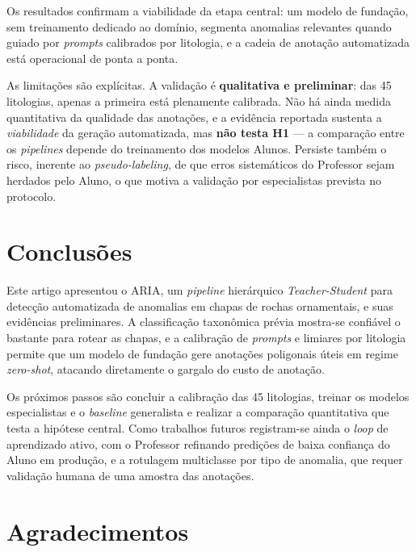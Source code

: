 \documentclass[10pt,conference]{IEEEtran}
\begin{document}
Os resultados confirmam a viabilidade da etapa central: um modelo de fundação, sem treinamento dedicado ao domínio, segmenta anomalias relevantes quando guiado por \textit{prompts} calibrados por litologia, e a cadeia de anotação automatizada está operacional de ponta a ponta.

As limitações são explícitas. A validação é \textbf{qualitativa e preliminar}: das 45 litologias, apenas a primeira está plenamente calibrada. Não há ainda medida quantitativa da qualidade das anotações, e a evidência reportada sustenta a \textit{viabilidade} da geração automatizada, mas \textbf{não testa H1} --- a comparação entre os \textit{pipelines} depende do treinamento dos modelos Alunos. Persiste também o risco, inerente ao \textit{pseudo-labeling}, de que erros sistemáticos do Professor sejam herdados pelo Aluno, o que motiva a validação por especialistas prevista no protocolo.

\section{Conclusões}

Este artigo apresentou o ARIA, um \textit{pipeline} hierárquico \textit{Teacher-Student} para detecção automatizada de anomalias em chapas de rochas ornamentais, e suas evidências preliminares. A classificação taxonômica prévia mostra-se confiável o bastante para rotear as chapas, e a calibração de \textit{prompts} e limiares por litologia permite que um modelo de fundação gere anotações poligonais úteis em regime \textit{zero-shot}, atacando diretamente o gargalo do custo de anotação.

Os próximos passos são concluir a calibração das 45 litologias, treinar os modelos especialistas e o \textit{baseline} generalista e realizar a comparação quantitativa que testa a hipótese central. Como trabalhos futuros registram-se ainda o \textit{loop} de aprendizado ativo, com o Professor refinando predições de baixa confiança do Aluno em produção, e a rotulagem multiclasse por tipo de anomalia, que requer validação humana de uma amostra das anotações.

\section*{Agradecimentos}

\end{document}
